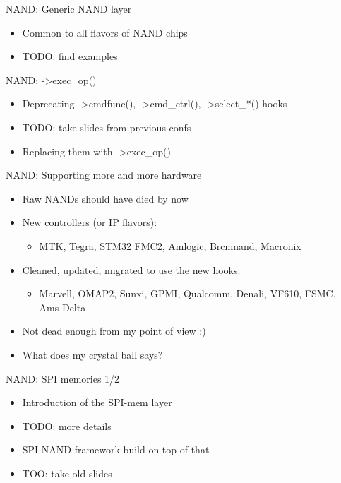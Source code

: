 \documentclass[aspectratio=169,obeyspaces,spaces,hyphens,dvipsnames]{beamer}
\begin{document}
\begin{frame}{NAND: Generic NAND layer}
  \begin{itemize}
  \item Common to all flavors of NAND chips
  \item TODO: find examples
  \end{itemize}
\end{frame}

\begin{frame}{NAND: ->exec\_op()}
  \begin{itemize}
  \item Deprecating ->cmdfunc(), ->cmd\_ctrl(), ->select\_*() hooks
  \item TODO: take slides from previous confs
  \item Replacing them with ->exec\_op()
  \end{itemize}
\end{frame}

\begin{frame}{NAND: Supporting more and more hardware}
  \begin{itemize}
  \item Raw NANDs should have died by now
  \item New controllers (or IP flavors):
    \begin{itemize}
    \item MTK, Tegra, STM32 FMC2, Amlogic, Brcmnand, Macronix
    \end{itemize}
  \item Cleaned, updated, migrated to use the new hooks:
    \begin{itemize}
    \item Marvell, OMAP2, Sunxi, GPMI, Qualcomm, Denali, VF610, FSMC, Ams-Delta
    \end{itemize}
  \item Not dead enough from my point of view :)
  \item What does my crystal ball says?
  \end{itemize}
\end{frame}

\begin{frame}{NAND: SPI memories 1/2}
  \begin{itemize}
  \item Introduction of the SPI-mem layer
  \item TODO: more details
  \item SPI-NAND framework build on top of that
  \item TOO: take old slides
  \end{itemize}
\end{frame}
\end{document}
